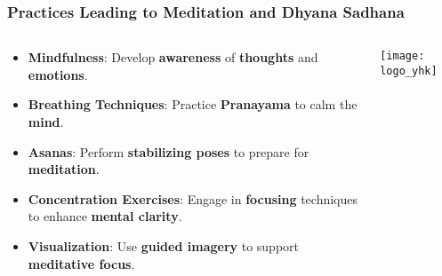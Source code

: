 \begin{frame}[fragile]\frametitle{Practices Leading to Meditation and Dhyana Sadhana}
\begin{columns}
    \begin{column}[T]{0.5\linewidth}
      \begin{itemize}
        \item \textbf{Mindfulness}: Develop \textbf{awareness} of \textbf{thoughts} and \textbf{emotions}.
        \item \textbf{Breathing Techniques}: Practice \textbf{Pranayama} to calm the \textbf{mind}.
        \item \textbf{Asanas}: Perform \textbf{stabilizing poses} to prepare for \textbf{meditation}.
        \item \textbf{Concentration Exercises}: Engage in \textbf{focusing} techniques to enhance \textbf{mental clarity}.
        \item \textbf{Visualization}: Use \textbf{guided imagery} to support \textbf{meditative focus}.
      \end{itemize}
    \end{column}
    \begin{column}[T]{0.5\linewidth}
        \begin{center}
        \texttt{[image: logo\_yhk]}
        \end{center}	
    \end{column}
\end{columns}
\end{frame}
